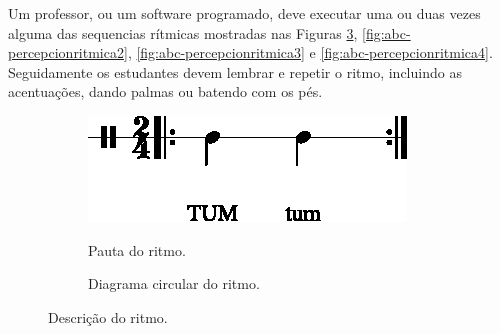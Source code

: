 \begin{example}
Um professor, ou um software programado, 
deve executar uma ou duas vezes alguma das sequencias rítmicas mostradas nas Figuras 
\ref{fig:abc-percepcionritmica1}, \ref{fig:abc-percepcionritmica2},
\ref{fig:abc-percepcionritmica3}  e \ref{fig:abc-percepcionritmica4}.
Seguidamente os estudantes devem lembrar e repetir o ritmo, 
incluindo as acentuações, dando palmas ou batendo com os pés.
\end{example}


\begin{figure}[H]
\centering
     \begin{subfigure}[c]{0.45\textwidth}
         \centering
         \href{https://drive.google.com/file/d/1c7OawI0qFdiDDiskMlfJAh-l5GYBKVzQ/view?usp=sharing}{\includegraphics[width=\textwidth]{chapters/cap-musicalidade-percepcion/treino-ritmo1-1.eps}}
         \caption{Pauta do ritmo.}
         \label{fig:RitmoTUMtum1}
     \end{subfigure}
     \hfill
     \begin{subfigure}[c]{0.45\textwidth}
         \centering
{}
         \caption{Diagrama circular do ritmo.}
         \label{fig:RitmoTUMtum2}
     \end{subfigure}
\caption{Descrição do ritmo.}
\label{fig:abc-percepcionritmica1}
\end{figure}


